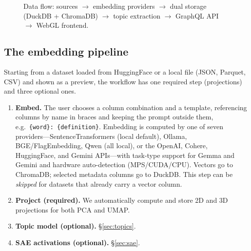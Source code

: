 \documentclass[11pt]{article}
\begin{document}
\begin{figure}[t]
  \centering
  \caption{Data flow: sources $\rightarrow$ embedding providers
  $\rightarrow$ dual storage (DuckDB + ChromaDB) $\rightarrow$ topic
  extraction $\rightarrow$ GraphQL API $\rightarrow$ WebGL frontend.}
  \label{fig:arch}
\end{figure}

\subsection{The embedding pipeline}
\label{sec:pipeline}
Starting from a dataset loaded from HuggingFace or a local file (JSON,
Parquet, CSV) and shown as a preview, the workflow has one required step
(projections) and three optional ones.

\begin{enumerate}[nosep]
  \item \textbf{Embed.} The user chooses a column combination and a
  template, referencing columns by name in braces and keeping the prompt
  outside them, e.g.\ \texttt{\{word\}: \{definition\}}. Embedding is
  computed by one of seven providers---SentenceTransformers (local
  default), Ollama, BGE/FlagEmbedding, Qwen (all local), or the OpenAI,
  Cohere, HuggingFace, and Gemini APIs---with task-type support for Gemma
  and Gemini and hardware auto-detection (MPS/CUDA/CPU). Vectors go to
  ChromaDB; selected metadata columns go to DuckDB. This step can be
  \emph{skipped} for datasets that already carry a vector column.
  \item \textbf{Project (required).} We automatically compute and store 2D
  and 3D projections for both PCA and UMAP.
  \item \textbf{Topic model (optional).} \S\ref{sec:topics}.
  \item \textbf{SAE activations (optional).} \S\ref{sec:sae}.
\end{enumerate}
\end{document}
